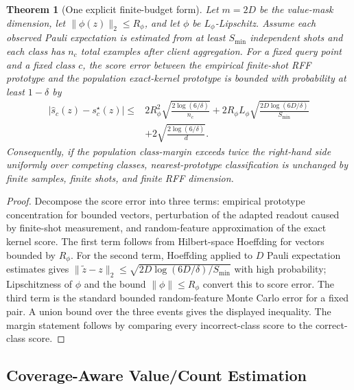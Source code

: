 \documentclass[preprint]{elsarticle}
\newtheorem{theorem}{Theorem}
\begin{document}
\begin{theorem}[One explicit finite-budget form]
\label{thm:finite-budget}
Let \(m=2D\) be the value-mask dimension, let \(\|\phi(z)\|_2\le R_\phi\), and let \(\phi\) be \(L_\phi\)-Lipschitz. Assume each observed Pauli expectation is estimated from at least \(S_{\min}\) independent shots and each class has \(n_c\) total examples after client aggregation. For a fixed query point and a fixed class \(c\), the score error between the empirical finite-shot RFF prototype and the population exact-kernel prototype is bounded with probability at least \(1-\delta\) by
\begin{equation}
\begin{aligned}
    |\widehat{s}_c(z)-s_c^\star(z)|
    \le&
    2R_\phi^2\sqrt{\frac{2\log(6/\delta)}{n_c}}
    +2R_\phi L_\phi
    \sqrt{\frac{2D\log(6D/\delta)}{S_{\min}}}  \\
    &+
    2\sqrt{\frac{2\log(6/\delta)}{d}} .
\end{aligned}
\end{equation}
Consequently, if the population class-margin exceeds twice the right-hand side uniformly over competing classes, nearest-prototype classification is unchanged by finite samples, finite shots, and finite RFF dimension.
\end{theorem}

\begin{proof}
Decompose the score error into three terms: empirical prototype concentration for bounded vectors, perturbation of the adapted readout caused by finite-shot measurement, and random-feature approximation of the exact kernel score. The first term follows from Hilbert-space Hoeffding for vectors bounded by \(R_\phi\). For the second term, Hoeffding applied to \(D\) Pauli expectation estimates gives \(\|\tilde z-z\|_2\le\sqrt{2D\log(6D/\delta)/S_{\min}}\) with high probability; Lipschitzness of \(\phi\) and the bound \(\|\phi\|\le R_\phi\) convert this to score error. The third term is the standard bounded random-feature Monte Carlo error for a fixed pair. A union bound over the three events gives the displayed inequality. The margin statement follows by comparing every incorrect-class score to the correct-class score.
\end{proof}

\subsection{Coverage-Aware Value/Count Estimation}
\end{document}
